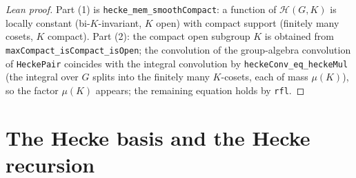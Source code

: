 \begin{proof}[Lean proof]
Part (1) is \texttt{hecke\_mem\_smoothCompact}: a function of $\mathcal H(G,K)$ is locally constant (bi-$K$-invariant, $K$ open) with compact support (finitely many cosets, $K$ compact). Part (2): the compact open subgroup $K$ is obtained from \texttt{maxCompact\_isCompact\_isOpen}; the convolution of the group-algebra convolution of \texttt{HeckePair} coincides with the integral convolution by \texttt{heckeConv\_eq\_heckeMul} (the integral over $G$ splits into the finitely many $K$-cosets, each of mass $\mu(K)$), so the factor $\mu(K)$ appears; the remaining equation holds by \texttt{rfl}.
\end{proof}

\section{The Hecke basis and the Hecke recursion}


